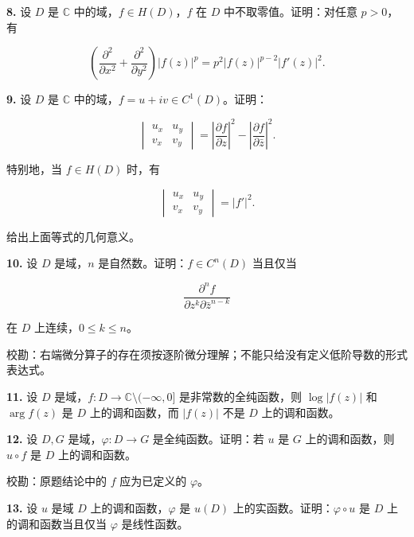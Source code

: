 \documentclass[11pt,a4paper]{article}
\begin{document}
\par{}
\noindent\textbf{8.} 设 \(D\) 是 \(\mathbb C\) 中的域，\(f\in H(D)\)，\(f\) 在
\(D\) 中不取零值。证明：对任意 \(p>0\)，有

\[
\left(\frac{\partial^2}{\partial x^2}+\frac{\partial^2}{\partial y^2}\right)|f(z)|^p
=p^2|f(z)|^{p-2}|f'(z)|^2.
\]

\par{}
\noindent\textbf{9.} 设 \(D\) 是 \(\mathbb C\)
中的域，\(f=u+iv\in C^1(D)\)。证明：

\[
\begin{vmatrix}u_x&u_y\\v_x&v_y\end{vmatrix}
=\left|\frac{\partial f}{\partial z}\right|^2-\left|\frac{\partial f}{\partial\bar z}\right|^2.
\]

特别地，当 \(f\in H(D)\) 时，有

\[
\begin{vmatrix}u_x&u_y\\v_x&v_y\end{vmatrix}=|f'|^2.
\]

给出上面等式的几何意义。

\par{}
\noindent\textbf{10.} 设 \(D\) 是域，\(n\) 是自然数。证明：\(f\in C^n(D)\)
当且仅当

\[
\frac{\partial^nf}{\partial z^k\partial\bar z^{n-k}}
\]

在 \(D\) 上连续，\(0\le k\le n\)。

校勘：右端微分算子的存在须按逐阶微分理解；不能只给没有定义低阶导数的形式表达式。

\par{}
\noindent\textbf{11.} 设 \(D\) 是域，\(f:D\to\mathbb C\setminus(-\infty,0]\)
是非常数的全纯函数，则 \(\log|f(z)|\) 和 \(\arg f(z)\) 是 \(D\)
上的调和函数，而 \(|f(z)|\) 不是 \(D\) 上的调和函数。

\par{}
\noindent\textbf{12.} 设 \(D,G\) 是域，\(\varphi:D\to G\) 是全纯函数。证明：若
\(u\) 是 \(G\) 上的调和函数，则 \(u\circ f\) 是 \(D\) 上的调和函数。

校勘：原题结论中的 \(f\) 应为已定义的 \(\varphi\)。

\par{}
\noindent\textbf{13.} 设 \(u\) 是域 \(D\) 上的调和函数，\(\varphi\) 是 \(u(D)\)
上的实函数。证明：\(\varphi\circ u\) 是 \(D\) 上的调和函数当且仅当
\(\varphi\) 是线性函数。
\end{document}
